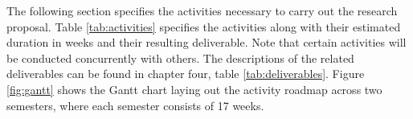 \documentclass[../main.tex]{subfiles}
\begin{document}
The following section specifies the activities necessary to carry out the  research proposal.
Table \ref{tab:activities} specifies the activities along with their estimated duration in weeks and their resulting deliverable.
Note that certain activities will be conducted concurrently with others.
The descriptions of the related deliverables can be found in chapter four, table \ref{tab:deliverables}.
Figure \ref{fig:gantt} shows the Gantt chart laying out the activity roadmap across two semesters, where each semester consists of 17 weeks.




\end{document}
